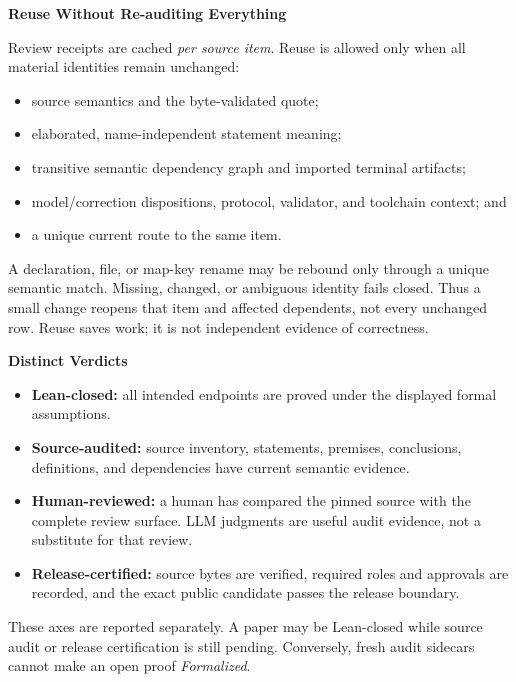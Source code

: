 \documentclass[10pt]{article}
\newcommand{\Lean}{Lean}
\begin{document}
\vspace{7pt}
\begin{minipage}[t]{0.49\textwidth}
{\sffamily\bfseries\large Reuse Without Re-auditing Everything}

Review receipts are cached \emph{per source item}. Reuse is allowed only when
all material identities remain unchanged:
\begin{itemize}
  \item source semantics and the byte-validated quote;
  \item elaborated, name-independent statement meaning;
  \item transitive semantic dependency graph and imported terminal artifacts;
  \item model/correction dispositions, protocol, validator, and toolchain
  context; and
  \item a unique current route to the same item.
\end{itemize}
A declaration, file, or map-key rename may be rebound only through a unique
semantic match. Missing, changed, or ambiguous identity fails closed. Thus a
small change reopens that item and affected dependents, not every unchanged
row. Reuse saves work; it is not independent evidence of correctness.
\end{minipage}\hfill
\begin{minipage}[t]{0.48\textwidth}
{\sffamily\bfseries\large Distinct Verdicts}

\begin{itemize}
  \item \textbf{Lean-closed:} all intended endpoints are proved under the
  displayed formal assumptions.
  \item \textbf{Source-audited:} source inventory, statements, premises,
  conclusions, definitions, and dependencies have current semantic evidence.
  \item \textbf{Human-reviewed:} a human has compared the pinned source with
  the complete review surface. LLM judgments are useful audit evidence, not a
  substitute for that review.
  \item \textbf{Release-certified:} source bytes are verified, required roles
  and approvals are recorded, and the exact public candidate passes the release
  boundary.
\end{itemize}
These axes are reported separately. A paper may be \Lean{}-closed while source
audit or release certification is still pending. Conversely, fresh audit
sidecars cannot make an open proof \emph{Formalized}.
\end{minipage}
\end{document}
